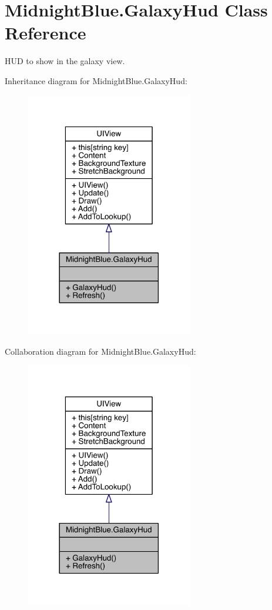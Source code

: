 \hypertarget{class_midnight_blue_1_1_galaxy_hud}{}\section{Midnight\+Blue.\+Galaxy\+Hud Class Reference}
\label{class_midnight_blue_1_1_galaxy_hud}


H\+UD to show in the galaxy view.  




Inheritance diagram for Midnight\+Blue.\+Galaxy\+Hud\+:\nopagebreak
\begin{figure}[H]
\begin{center}
\leavevmode
\includegraphics[width=206pt]{class_midnight_blue_1_1_galaxy_hud__inherit__graph}
\end{center}
\end{figure}


Collaboration diagram for Midnight\+Blue.\+Galaxy\+Hud\+:\nopagebreak
\begin{figure}[H]
\begin{center}
\leavevmode
\includegraphics[width=206pt]{class_midnight_blue_1_1_galaxy_hud__coll__graph}
\end{center}
\end{figure}
